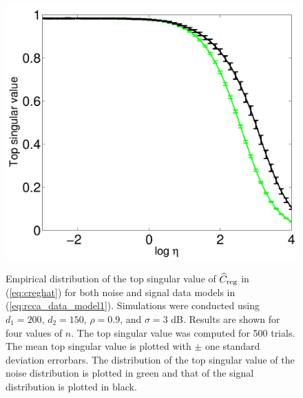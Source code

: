 \begin{figure}[h!]
{\includegraphics[width=\figwidth]{figures/rcca_errorbars_high_snr_n_300.pdf} 
} 
\caption{Empirical distribution of the top singular value of $\widehat{C}_{\text{reg}}$ in
  (\ref{eq:creghat}) for both noise and signal data models in
  (\ref{eq:rcca_data_model1}). Simulations were conducted using $d_1=200$, $d_2=150$,
  $\rho=0.9$, and $\sigma=3$ dB. Results are shown for four values of $n$. The top singular
  value was computed for 500 trials. The mean top singular value is plotted with $\pm$ one
  standard deviation errorbars. The distribution of the top singular value of the noise
  distribution is plotted in green and that of the signal distribution is plotted in
  black.}
\label{fig:rcca_errorbars_high_snr}
\end{figure}

